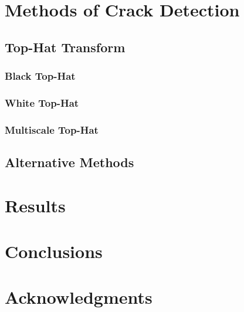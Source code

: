 \documentclass{sig-alternate}
\begin{document}
\section{Methods of Crack Detection}

\subsection{Top-Hat Transform}

\subsubsection{Black Top-Hat}\label{black top-hat}

\subsubsection{White Top-Hat}\label{white top-hat}

\subsubsection{Multiscale Top-Hat}

\subsection{Alternative Methods}

\section{Results}

\section{Conclusions}

\section{Acknowledgments}


  
\end{document}
